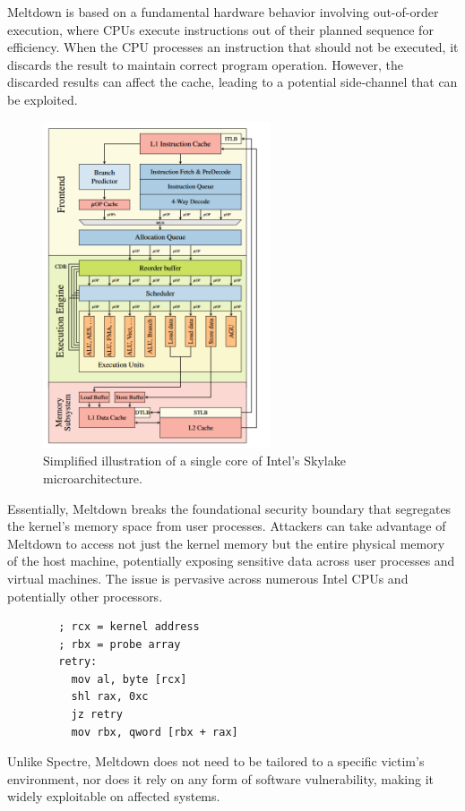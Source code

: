 \begin{enumerate}
      Meltdown is based on a fundamental hardware behavior involving out-of-order execution, where CPUs execute instructions out of their planned sequence for efficiency. When the CPU processes an instruction that should not be executed, it discards the result to maintain correct program operation. However, the discarded results can affect the cache, leading to a potential side-channel that can be exploited.
      
      \begin{figure}[H]
        \centering
        \includegraphics[width=0.6\textwidth]{images/intel-cpu.png}
        \caption{Simplified illustration of a single core of Intel's Skylake microarchitecture.\cite{lippMeltdown2018}}
        \label{fig:meltdown}
      \end{figure}
      
      Essentially, Meltdown breaks the foundational security boundary that segregates the kernel's memory space from user processes. Attackers can take advantage of Meltdown to access not just the kernel memory but the entire physical memory of the host machine, potentially exposing sensitive data across user processes and virtual machines. The issue is pervasive across numerous Intel CPUs and potentially other processors.
      
      \begin{verbatim}
        ; rcx = kernel address 
        ; rbx = probe array 
        retry: 
          mov al, byte [rcx] 
          shl rax, 0xc 
          jz retry
          mov rbx, qword [rbx + rax]
      \end{verbatim}
      
      Unlike Spectre, Meltdown does not need to be tailored to a specific victim's environment, nor does it rely on any form of software vulnerability, making it widely exploitable on affected systems.     
\end{enumerate}
      
